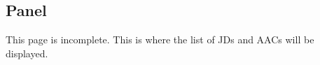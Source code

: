 \subsection{Panel}
This page is incomplete. This is where the list of JDs and AACs will be displayed.